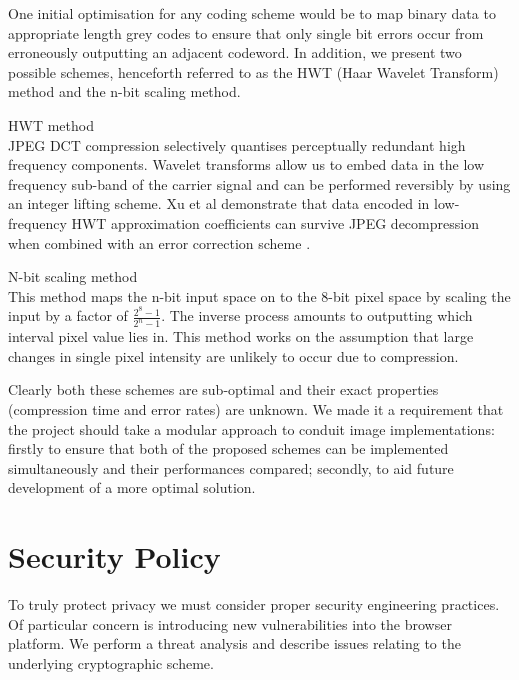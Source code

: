 One initial optimisation for any coding scheme would be to map binary data to appropriate length grey codes to ensure that only single bit errors occur from erroneously outputting an adjacent codeword. In addition, we present two possible schemes, henceforth referred to as the HWT (Haar Wavelet Transform) method and the n-bit scaling method.

\begin{sdesc}

    \item[HWT method] \hfill \\ JPEG DCT compression selectively quantises perceptually redundant high frequency components. Wavelet transforms allow us to embed data in the low frequency sub-band of the carrier signal and can be performed reversibly by using an integer lifting scheme. Xu et al demonstrate that data encoded in low-frequency HWT approximation coefficients can survive JPEG decompression when combined with an error correction scheme \cite{haar}.
    
    \item[N-bit scaling method] \hfill \\ This method maps the n-bit input space on to the 8-bit pixel space by scaling the input by a factor of $ \frac{2^8 - 1}{2^n - 1}$. The inverse process amounts to outputting which interval pixel value lies in. This method works on the assumption that large changes in single pixel intensity are unlikely to occur due to compression.

\end{sdesc}

Clearly both these schemes are sub-optimal and their exact properties (compression time and error rates) are unknown. We made it a requirement that the project should take a modular approach to conduit image implementations: firstly to ensure that both of the proposed schemes can be implemented simultaneously and their performances compared; secondly, to aid future development of a more optimal solution.



\FloatBarrier 
\section{Security Policy}
\label{sec:security}

To truly protect privacy we must consider proper security engineering practices. Of particular concern is introducing new vulnerabilities into the browser platform. We perform a threat analysis and describe issues relating to the underlying cryptographic scheme.

